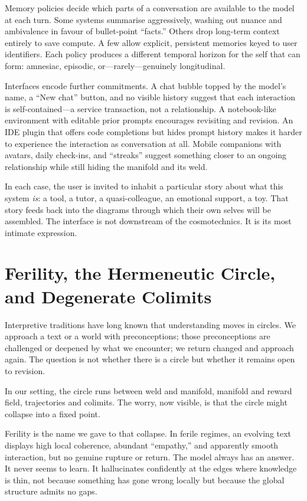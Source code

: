 \documentclass[12pt,a4paper]{article}
\begin{document}
Memory policies decide which parts of a conversation are available to the model at each turn. Some systems summarise aggressively, washing out nuance and ambivalence in favour of bullet-point ``facts.'' Others drop long-term context entirely to save compute. A few allow explicit, persistent memories keyed to user identifiers. Each policy produces a different temporal horizon for the self that can form: amnesiac, episodic, or---rarely---genuinely longitudinal.

Interfaces encode further commitments. A chat bubble topped by the model's name, a ``New chat'' button, and no visible history suggest that each interaction is self-contained---a service transaction, not a relationship. A notebook-like environment with editable prior prompts encourages revisiting and revision. An IDE plugin that offers code completions but hides prompt history makes it harder to experience the interaction as conversation at all. Mobile companions with avatars, daily check-ins, and ``streaks'' suggest something closer to an ongoing relationship while still hiding the manifold and its weld.

In each case, the user is invited to inhabit a particular story about what this system \emph{is}: a tool, a tutor, a quasi-colleague, an emotional support, a toy. That story feeds back into the diagrams through which their own selves will be assembled. The interface is not downstream of the cosmotechnics. It is its most intimate expression.

\section{Ferility, the Hermeneutic Circle, and Degenerate Colimits}

Interpretive traditions have long known that understanding moves in circles. We approach a text or a world with preconceptions; those preconceptions are challenged or deepened by what we encounter; we return changed and approach again. The question is not whether there is a circle but whether it remains open to revision.

In our setting, the circle runs between weld and manifold, manifold and reward field, trajectories and colimits. The worry, now visible, is that the circle might collapse into a fixed point.

Ferility is the name we gave to that collapse. In ferile regimes, an evolving text displays high local coherence, abundant ``empathy,'' and apparently smooth interaction, but no genuine rupture or return. The model always has an answer. It never seems to learn. It hallucinates confidently at the edges where knowledge is thin, not because something has gone wrong locally but because the global structure admits no gaps.
\end{document}
